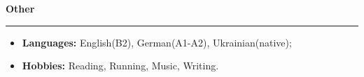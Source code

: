{
    {\vspace{0.5cm} \hspace{-0.5cm} \Large \textbf{Other}}
    \par\noindent\rule{\textwidth}{0.1mm}

    \begin{itemize}
        \item \textbf{Languages:} English(B2), German(A1-A2), Ukrainian(native);
        \item \textbf{Hobbies:} Reading, Running, Music, Writing.
    \end{itemize}
}
